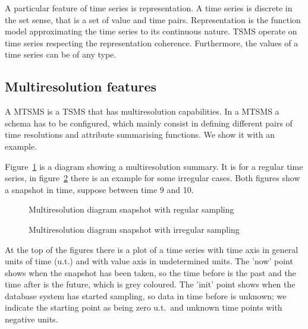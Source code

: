 A particular feature of time series is representation. A time series
is discrete in the set sense, that is a set of value and time
pairs. Representation is the function model approximating the time
series to its continuous nature. TSMS operate on time series
respecting the representation coherence. Furthermore, the values of a
time series can be of any type.





\subsection{Multiresolution features}

A MTSMS is a TSMS that has multiresolution capabilities.
In a MTSMS a schema has to be configured, which mainly consist in
defining different pairs of time resolutions and attribute summarising
functions. We show it with an example.

Figure~\ref{fig:mtsms:sequence} is a diagram showing a multiresolution
summary. It is for a regular time series, in
figure~\ref{fig:mtsms:sequence-irregular} there is an example for some
irregular cases. Both figures show a snapshot in time, suppose between
time 9 and 10.  

\begin{figure}[tp]
  \centering
  
  \caption{Multiresolution diagram snapshot with regular sampling}
  \label{fig:mtsms:sequence}
\end{figure}


\begin{figure}[tp]
  \centering
  
  \caption{Multiresolution diagram snapshot with irregular sampling}
  \label{fig:mtsms:sequence-irregular}
\end{figure}

At the top of the figures there is a plot of a time series with time
axis in general units of time (u.t.) and with value axis in
undetermined units. The 'now' point shows when the snapshot has been
taken, so the time before is the past and the time after is the
future, which is grey coloured. The 'init' point shows when the
database system has started sampling, so data in time before is
unknown; we indicate the starting point as being zero u.t.\ and unknown
time points with negative units.

